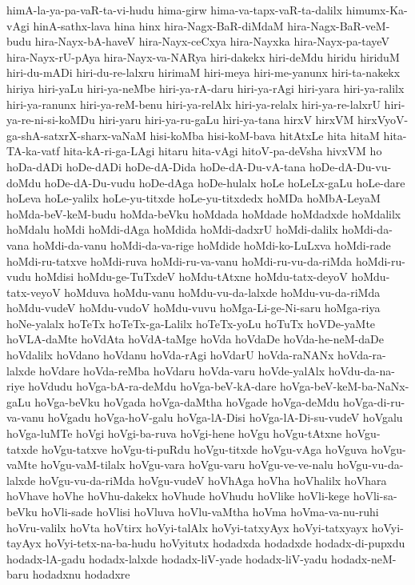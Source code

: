 {himA-la-ya-pa-vaR-ta-vi-hudu
hima-girw
hima-va-tapx-vaR-ta-dalilx
himumx-Ka-vAgi
hinA-sathx-lava
hina
hinx
hira-Nagx-BaR-diMdaM
hira-Nagx-BaR-veM-budu
hira-Nayx-bA-haveV
hira-Nayx-ceCxya
hira-Nayxka
hira-Nayx-pa-tayeV
hira-Nayx-rU-pAya
hira-Nayx-va-NARya
hiri-dakekx
hiri-deMdu
hiridu
hiriduM
hiri-du-mADi
hiri-du-re-lalxru
hirimaM
hiri-meya
hiri-me-yanunx
hiri-ta-nakekx
hiriya
hiri-yaLu
hiri-ya-neMbe
hiri-ya-rA-daru
hiri-ya-rAgi
hiri-yara
hiri-ya-ralilx
hiri-ya-ranunx
hiri-ya-reM-benu
hiri-ya-relAlx
hiri-ya-relalx
hiri-ya-re-lalxrU
hiri-ya-re-ni-si-koMDu
hiri-yaru
hiri-ya-ru-gaLu
hiri-ya-tana
hirxV
hirxVM
hirxVyoV-ga-shA-satxrX-sharx-vaNaM
hisi-koMba
hisi-koM-bava
hitAtxLe
hita
hitaM
hita-TA-ka-vatf
hita-kA-ri-ga-LAgi
hitaru
hita-vAgi
hitoV-pa-deVsha
hivxVM
ho
hoDa-dADi
hoDe-dADi
hoDe-dA-Dida
hoDe-dA-Du-vA-tana
hoDe-dA-Du-vu-doMdu
hoDe-dA-Du-vudu
hoDe-dAga
hoDe-hulalx
hoLe
hoLeLx-gaLu
hoLe-dare
hoLeva
hoLe-yalilx
hoLe-yu-titxde
hoLe-yu-titxdedx
hoMDa
hoMbA-LeyaM
hoMda-beV-keM-budu
hoMda-beVku
hoMdada
hoMdade
hoMdadxde
hoMdalilx
hoMdalu
hoMdi
hoMdi-dAga
hoMdida
hoMdi-dadxrU
hoMdi-dalilx
hoMdi-da-vana
hoMdi-da-vanu
hoMdi-da-va-rige
hoMdide
hoMdi-ko-LuLxva
hoMdi-rade
hoMdi-ru-tatxve
hoMdi-ruva
hoMdi-ru-va-vanu
hoMdi-ru-vu-da-riMda
hoMdi-ru-vudu
hoMdisi
hoMdu-ge-TuTxdeV
hoMdu-tAtxne
hoMdu-tatx-deyoV
hoMdu-tatx-veyoV
hoMduva
hoMdu-vanu
hoMdu-vu-da-lalxde
hoMdu-vu-da-riMda
hoMdu-vudeV
hoMdu-vudoV
hoMdu-vuvu
hoMga-Li-ge-Ni-saru
hoMga-riya
hoNe-yalalx
hoTeTx
hoTeTx-ga-Lalilx
hoTeTx-yoLu
hoTuTx
hoVDe-yaMte
hoVLA-daMte
hoVdAta
hoVdA-taMge
hoVda
hoVdaDe
hoVda-he-neM-daDe
hoVdalilx
hoVdano
hoVdanu
hoVda-rAgi
hoVdarU
hoVda-raNANx
hoVda-ra-lalxde
hoVdare
hoVda-reMba
hoVdaru
hoVda-varu
hoVde-yalAlx
hoVdu-da-na-riye
hoVdudu
hoVga-bA-ra-deMdu
hoVga-beV-kA-dare
hoVga-beV-keM-ba-NaNx-gaLu
hoVga-beVku
hoVgada
hoVga-daMtha
hoVgade
hoVga-deMdu
hoVga-di-ru-va-vanu
hoVgadu
hoVga-hoV-galu
hoVga-lA-Disi
hoVga-lA-Di-su-vudeV
hoVgalu
hoVga-luMTe
hoVgi
hoVgi-ba-ruva
hoVgi-hene
hoVgu
hoVgu-tAtxne
hoVgu-tatxde
hoVgu-tatxve
hoVgu-ti-puRdu
hoVgu-titxde
hoVgu-vAga
hoVguva
hoVgu-vaMte
hoVgu-vaM-tilalx
hoVgu-vara
hoVgu-varu
hoVgu-ve-ve-nalu
hoVgu-vu-da-lalxde
hoVgu-vu-da-riMda
hoVgu-vudeV
hoVhAga
hoVha
hoVhalilx
hoVhara
hoVhave
hoVhe
hoVhu-dakekx
hoVhude
hoVhudu
hoVlike
hoVli-kege
hoVli-sa-beVku
hoVli-sade
hoVlisi
hoVluva
hoVlu-vaMtha
hoVma
hoVma-va-nu-ruhi
hoVru-valilx
hoVta
hoVtirx
hoVyi-talAlx
hoVyi-tatxyAyx
hoVyi-tatxyayx
hoVyi-tayAyx
hoVyi-tetx-na-ba-hudu
hoVyitutx
hodadxda
hodadxde
hodadx-di-pupxdu
hodadx-lA-gadu
hodadx-lalxde
hodadx-liV-yade
hodadx-liV-yadu
hodadx-neM-baru
hodadxnu
hodadxre
}
